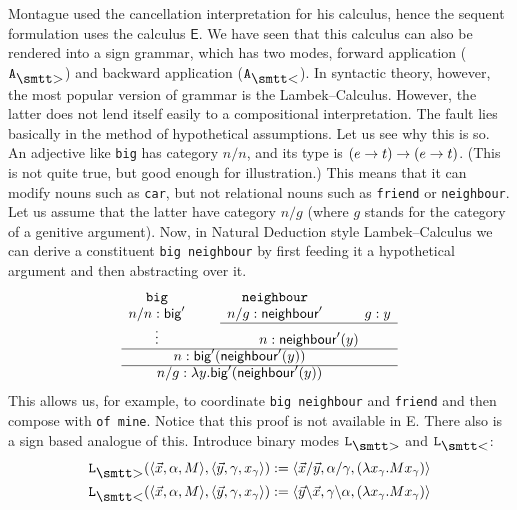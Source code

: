 Montague used the cancellation interpretation for his calculus,
hence the sequent formulation uses the calculus $\textsf{E}$. We 
have seen that this calculus can also be rendered into a sign grammar, 
which has two modes, forward application ($\mbox{\tt A}_{\sgr}$) and
backward application ($\mbox{\tt A}_{\skl}$). In syntactic theory,
however, the most popular version of grammar is the
Lambek--Calculus. However, the latter does not lend itself easily
to a compositional interpretation. The fault lies basically in the
method of hypothetical assumptions. Let us see why this is so. An
adjective like {\tt big} has category $n/n$, and its
type is $(e \rightarrow t) \rightarrow (e \rightarrow t)$. (This is not quite
true, but good enough for illustration.) This means that it can
modify nouns such as {\tt car}, but not relational nouns
such as {\tt friend} or {\tt neighbour}. Let us assume that the
latter have category $n/g$ (where $g$ stands for the category 
of a genitive argument). Now, in Natural Deduction style
Lambek--Calculus we can derive a constituent {\tt big neighbour}
by first feeding it a hypothetical argument and then abstracting
over it.
\begin{equation}
\begin{array}{ccccc}
\mbox{\tt big} & \quad & \mbox{\tt neighbour} & \quad & \\
n/n : \textsf{big}' & &
    n/g : \textsf{neighbour}' & & g : y \\\cline{3-5}
\vdots & & \multicolumn{3}{c}{n : \textsf{neighbour}'(y)} \\\cline{1-5}
\multicolumn{4}{c}{n : \textsf{big}'(\textsf{neighbour}'(y))}
    \\\cline{1-5}
\multicolumn{4}{c}{n/g : \lambda y.\textsf{big}'(\textsf{neighbour}'(y))}
\end{array}
\end{equation}
This allows us, for example, to coordinate {\tt big neighbour} and
{\tt friend} and then compose with {\tt of mine}. Notice that this 
proof is not available in \textsf{E}. There also is a sign based 
analogue of this. Introduce binary modes $\mbox{\tt L}_{\sgr}$ and 
$\mbox{\tt L}_{\skl}$:
\begin{equation}
\begin{split}
\mbox{\tt L}_{\sgr}(\auf \vec{x}, \alpha, M\zu,
    \auf \vec{y}, \gamma, x_{\gamma}\zu)
    & := \auf \vec{x}/\vec{y}, \alpha/\gamma,
    (\lambda x_{\gamma}.Mx_{\gamma})\zu \\
\mbox{\tt L}_{\skl}(\auf \vec{x}, \alpha, M\zu,
    \auf \vec{y}, \gamma, x_{\gamma}\zu)
    & := \auf \vec{y}\backslash\vec{x}, \gamma\backslash\alpha,
    (\lambda x_{\gamma}.Mx_{\gamma})\zu
\end{split}
\end{equation}
